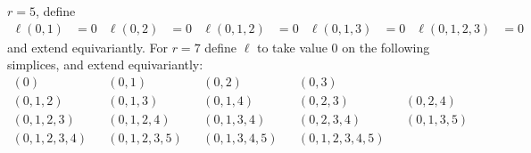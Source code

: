 \begin{lemma}
		\begin{example}
			$r=5$, define
			\begin{align*}
				\ell(0,1) &= 0 &
				\ell(0,2) &= 0 &
				\ell(0,1,2) &= 0 &
				\ell(0,1,3) &= 0 &
				\ell(0,1,2,3) &= 0
			\end{align*}
			and extend equivariantly. For $r=7$ define $\ell$ to take value $0$ on the following simplices, and extend equivariantly:
			\begin{align*}
				(0) &&
				(0,1) &&
				(0,2) &&
				(0,3) \\
				(0,1,2) &&
				(0,1,3) &&
				(0,1,4) &&
				(0,2,3) &&
				(0,2,4) \\
				(0,1,2,3) &&
				(0,1,2,4) &&
				(0,1,3,4) &&
				(0,2,3,4) &&
				(0,1,3,5) \\
				(0,1,2,3,4) &&
				(0,1,2,3,5) &&
				(0,1,3,4,5) &&
				(0,1,2,3,4,5)
			\end{align*}
		\end{example}

	\end{lemma}
